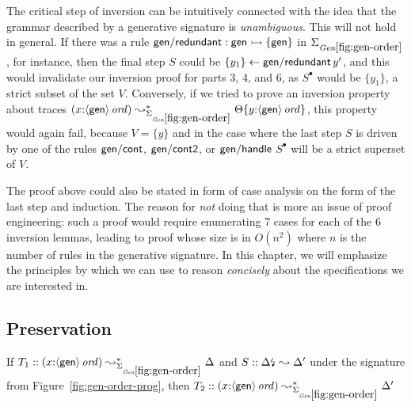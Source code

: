 The critical step of inversion can be intuitively connected with the
idea that the grammar described by a generative signature is {\it
  unambiguous}. This will not hold in general. If there was
a rule ${\sf gen/redundant} : {\sf gen} \rightarrowtail \{ {\sf gen} \}$ in
$\Sigma_{\it Gen\ref{fig:gen-order}}$, for instance, then the final
step $S$ could be
$\{{y_1}\} \leftarrow {{\sf gen/redundant}\,y'}$, and this would invalidate our
inversion proof
for parts 3, 4, and 6, as $S^{\bullet}$ would be $\{y_1\}$, a strict
subset of the set $V$. 
Conversely, if we tried to prove an inversion
property about traces $(x{:}\istrue{\susp{\sf gen}})
\leadsto^*_{\siggenorder} \tackon{\Theta}{y{:}\istrue{\susp{{\sf
        gen}}}}$, this property would again fail, because $V = \{ y
\}$ and in the case where the last step $S$ is driven by one of the
rules ${\sf gen/cont}$, ${\sf gen/cont2}$, or ${\sf gen/handle}$
$S^{\bullet}$ will be a strict superset of $V$.

The proof above could also be stated in form of case analysis on the
form of the last step and induction. The reason for {\it not} doing
that is more an issue of proof engineering: such a proof would require
enumerating 7 cases for each of the 6 inversion lemmas, leading to
proof whose size is in $O(n^2)$ where $n$ is the number of rules
in the generative signature. In this chapter, we will emphasize the principles
by which we can use to reason {\it concisely} about the specifications
we are interested in.

\subsection{Preservation}

\begin{theorem}\label{thm:siggenorder}
If $T_1 :: (x{:}\istrue{\susp{\sf gen}}) \leadsto^*_{\siggenorder} 
   \Delta$ and $S :: {\Delta}{\mbox{\lightning}}_{} \leadsto \Delta'$
under the signature from Figure~\ref{fig:gen-order-prog}, then
$T_2 :: (x{:}\istrue{\susp{\sf gen}}) \leadsto^*_{\siggenorder} 
   \Delta'$
\end{theorem}

